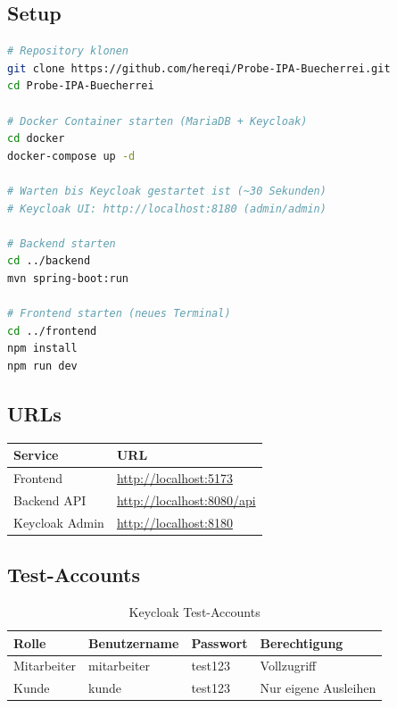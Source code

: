 \documentclass[a4paper,12pt,twoside]{report}
\begin{document}
\subsection{Setup}
\begin{lstlisting}[language=bash, caption=Installation]
# Repository klonen
git clone https://github.com/hereqi/Probe-IPA-Buecherrei.git
cd Probe-IPA-Buecherrei

# Docker Container starten (MariaDB + Keycloak)
cd docker
docker-compose up -d

# Warten bis Keycloak gestartet ist (~30 Sekunden)
# Keycloak UI: http://localhost:8180 (admin/admin)

# Backend starten
cd ../backend
mvn spring-boot:run

# Frontend starten (neues Terminal)
cd ../frontend
npm install
npm run dev
\end{lstlisting}

\subsection{URLs}
\begin{table}[H]
\centering
\begin{tabular}{l l}
\toprule
\textbf{Service} & \textbf{URL} \\
\midrule
Frontend & \url{http://localhost:5173} \\
Backend API & \url{http://localhost:8080/api} \\
Keycloak Admin & \url{http://localhost:8180} \\
\bottomrule
\end{tabular}
\end{table}

\subsection{Test-Accounts}
\begin{table}[H]
\centering
\begin{tabular}{l l l l}
\toprule
\textbf{Rolle} & \textbf{Benutzername} & \textbf{Passwort} & \textbf{Berechtigung} \\
\midrule
Mitarbeiter & mitarbeiter & test123 & Vollzugriff \\
Kunde & kunde & test123 & Nur eigene Ausleihen \\
\bottomrule
\end{tabular}
\caption{Keycloak Test-Accounts}
\end{table}
\end{document}
